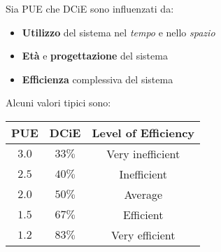 \newpage
Sia PUE che DCiE sono influenzati da:
\begin{itemize}
	\item \textbf{Utilizzo} del sistema nel \emph{tempo} e nello \emph{spazio}
	\item \textbf{Età} e \textbf{progettazione} del sistema
	\item \textbf{Efficienza} complessiva del sistema
\end{itemize}
Alcuni valori tipici sono:
\begin{table}[h]
	\centering
	\begin{tabular}{|c|c|c|}
		\hline
		\textbf{PUE} & \textbf{DCiE} & \textbf{Level of Efficiency} \\
		\hline
		$3.0$ & $33\%$ & Very inefficient \\
		\hline
		$2.5$ & $40\%$ & Inefficient \\
		\hline
		$2.0$ & $50\%$ & Average \\
		\hline
		$1.5$ & $67\%$ & Efficient \\
		\hline
		$1.2$ & $83\%$ & Very efficient \\
		\hline
	\end{tabular}
\end{table}